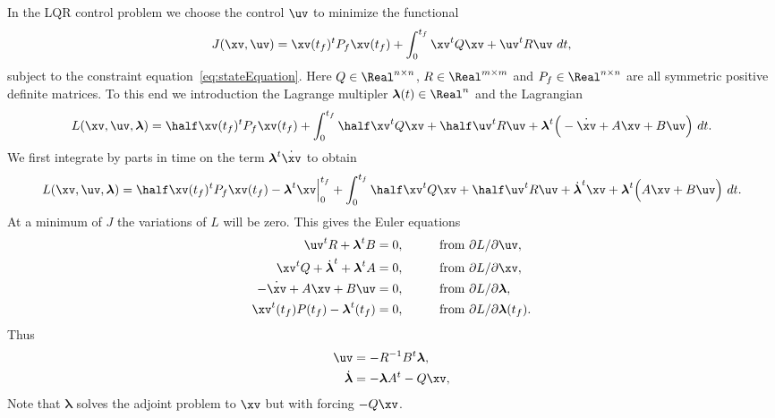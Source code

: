 \documentclass[11pt]{article}
\newcommand{\lambdav}{\boldsymbol{\lambda}}
\begin{document}
In the LQR control problem we choose the control $\uv$ to minimize the functional
\begin{align}
    J(\xv,\uv) = \xv(t_f)^t P_f \xv(t_f) + \int_0^{t_f} \xv^t Q \xv + \uv^t R \uv ~dt , \label{eq:LQRfunctional}
\end{align}
subject to the constraint equation~\eqref{eq:stateEquation}. Here $Q\in \Real^{n\times n}$, $R\in \Real^{m\times m}$
and $P_f \in \Real^{n\times n}$ are all symmetric positive definite matrices. 
To this end we introduction the Lagrange multipler $\lambdav(t)\in\Real^n$
and the Lagrangian
\begin{align}
    L(\xv,\uv,\lambdav) =  \half\xv(t_f)^t P_f \xv(t_f) + \int_0^{t_f} \half\xv^t Q \xv + \half\uv^t R \uv 
           + \lambdav^t\Big( -\dot{\xv} + A \xv + B \uv \Big) ~dt . \label{eq:Lagrangian}
\end{align}
We first integrate by parts in time on the term $\lambdav^t\dot{\xv}$ to obtain
\begin{align}
    L(\xv,\uv,\lambdav) =  \half\xv(t_f)^t P_f \xv(t_f) - \lambdav^t\xv\Big\vert_0^{t_f}  
     +  \int_0^{t_f} \half\xv^t Q \xv + \half\uv^t R \uv 
           + \dot{\lambdav}^t\xv + \lambdav^t\Big( A \xv + B \uv \Big) ~dt . \label{eq:LagrangianII}
\end{align}
At a minimum of $J$ the variations of $L$ will be zero.
This gives the Euler equations
\begin{alignat}{3}
   \uv^t R + \lambdav^t B &= 0 ,                    \qquad&& \text{from $\partial L/\partial \uv$}, \\
   \xv^tQ + \dot{\lambdav}^t  + \lambdav^t A &= 0 , \qquad&& \text{from $\partial L/\partial \xv$},  \\
   -\dot{\xv} + A \xv + B \uv &=0 ,                 \qquad&& \text{from $\partial L/\partial \lambdav$},  \\
   \xv^t(t_f) P(t_f) - \lambdav^t(t_f) &= 0,          \qquad&& \text{from $\partial L/\partial \lambdav(t_f)$}. 
\end{alignat}
Thus 
\begin{align}
   \uv &= - R^{-1} B^t \lambdav , \\
  \dot{\lambdav} &= -\lambdav A^t  - Q \xv, 
\end{align}
Note that $\lambdav$ solves the adjoint problem to $\xv$ but with forcing $-Q\xv$. 
\end{document}
